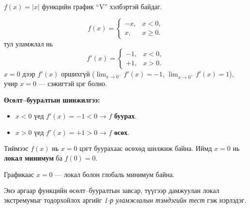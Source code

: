 \begin{example}
$f(x)=|x|$ функцийн график “V” хэлбэртэй байдаг. 

\[
f(x)=
\begin{cases}
 -x, & x<0,\\[3pt]
  x, & x\ge 0.
\end{cases}
\]
тул уламжлал нь
\[
f'(x)=
\begin{cases}
 -1, & x<0,\\[3pt]
 +1, & x>0.
\end{cases}
\]
$x=0$ дээр $f'(x)$ оршихгүй ($\lim_{x\to0^-}f'(x)=-1$, $\lim_{x\to0^+}f'(x)=1$), учир $x=0$ — сэжигтэй цэг болно.

\textbf{Өсөлт–бууралтын шинжилгээ:}
\begin{itemize}
  \item $x<0$ үед $f'(x)=-1<0$ → $f$ \textbf{буурах}.
  \item $x>0$ үед $f'(x)=+1>0$ → $f$ \textbf{өсөх}.
\end{itemize}

Тиймээс $f(x)$ нь $x=0$ цэгт буурахаас өсөхөд шилжиж байна.
Иймд $x=0$ нь \textbf{локал минимум} ба $f(0)=0$.
\begin{center}
\end{center}
Графикаас $x=0$ — локал болон глобаль минимум байна.
\end{example}

Энэ аргаар функцийн өсөлт–бууралтын завсар, түүгээр дамжуулан локал экстремумыг тодорхойлох аргийг \emph{1-р уламжлалын тэмдэгийн тест} гэж нэрлэдэг.

